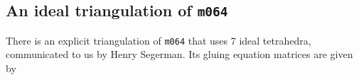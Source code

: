 \documentclass[12pt]{amsart}
\theoremstyle{definition}
\numberwithin{equation}{section}
\begin{document}
%

\subsection{An ideal triangulation of {\tt m064}}
\label{sub.m064}

There is an explicit triangulation of {\tt m064} that uses 7 ideal
tetrahedra, communicated to us by Henry Segerman. Its gluing equation matrices
are given by
\end{document}
